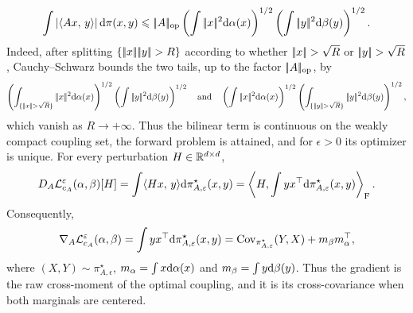 \[
\int\left\lvert\langle Ax,\,y\rangle\right\rvert\mathrm{d}\pi(x,y)
\leqslant
|\!| A |\!|_{\mathrm{op}}
\left(\int|\!| x |\!|^2\mathrm{d}\alpha(x)\right)^{1/2}
\left(\int|\!| y |\!|^2\mathrm{d}\beta(y)\right)^{1/2}.
\]
Indeed, after splitting $\{\norm{x}\norm{y}>R\}$ according to whether $\norm{x}>\sqrt R$ or $\norm{y}>\sqrt R$, Cauchy--Schwarz bounds the two tails, up to the factor $|\!| A |\!|_{\mathrm{op}}$, by
\[
\left(\int_{\{\norm{x}>\sqrt R\}}\norm{x}^2\d\alpha(x)\right)^{1/2}
\left(\int\norm{y}^2\d\beta(y)\right)^{1/2}
\qandq
\left(\int\norm{x}^2\d\alpha(x)\right)^{1/2}
\left(\int_{\{\norm{y}>\sqrt R\}}\norm{y}^2\d\beta(y)\right)^{1/2},
\]
which vanish as $R\to+\infty$. Thus the bilinear term is continuous on the weakly compact coupling set, the forward problem is attained, and for $\epsilon>0$ its optimizer is unique. For every perturbation $H\in\mathbb{R}^{d\times d}$,
\[
D_A\mathcal{L}_{c_A}^\varepsilon(\alpha,\beta)[H]
=
\int \langle Hx,\,y\rangle\mathrm{d}\pi_{A,\varepsilon}^\star(x,y)
=
\left\langle H,\int yx^\top\mathrm{d}\pi_{A,\varepsilon}^\star(x,y)\right\rangle_{\mathrm F}.
\]
Consequently,
\[
\nabla_A\mathcal{L}_{c_A}^\varepsilon(\alpha,\beta)
=
\int yx^\top\mathrm{d}\pi_{A,\varepsilon}^\star(x,y)
=
\operatorname{Cov}_{\pi_{A,\varepsilon}^\star}(Y,X)+m_\beta m_\alpha^\top,
\]
where $(X,Y)\sim\pi_{A,\epsilon}^\star$, $m_\alpha=\int x\mathrm{d}\alpha(x)$ and $m_\beta=\int y\mathrm{d}\beta(y)$. Thus the gradient is the raw cross-moment of the optimal coupling, and it is its cross-covariance when both marginals are centered.

